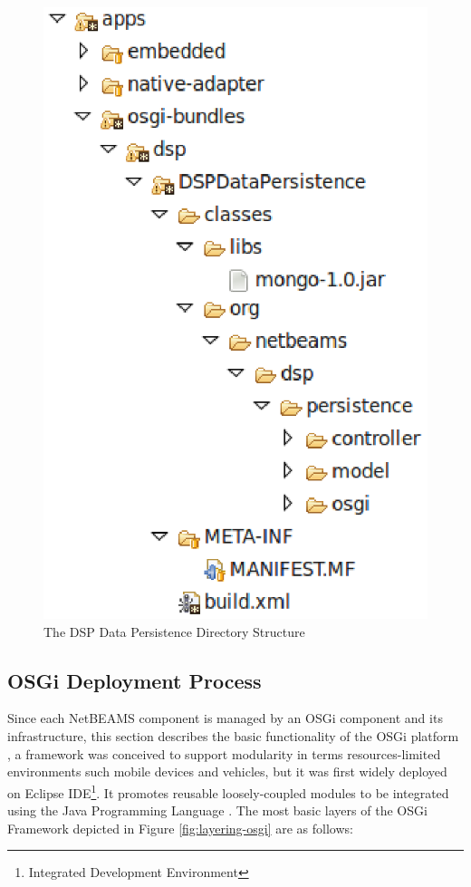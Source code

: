 \begin{figure}[!h]
  \centering
  \includegraphics[scale=0.65]{../diagrams/dsp-data-persistence-dir-checkedout}
  \caption{The DSP Data Persistence Directory Structure}
  \label{fig:dsp-data-persistence-dir-checkedout}
\end{figure}

\subsection{OSGi Deployment Process}
\label{sec:dsp-component-osgi-deployment}

Since each NetBEAMS component is managed by an OSGi component and its
infrastructure, this section describes the basic functionality of the
OSGi platform \cite{osgi}, a framework was conceived to support
modularity in terms resources-limited environments such mobile devices and
vehicles, but it was first widely deployed on Eclipse IDE\footnote{Integrated
Development Environment}. It promotes reusable loosely-coupled modules to be
integrated using the Java Programming Language \cite{java}. The most basic
layers of the OSGi Framework depicted in Figure \ref{fig:layering-osgi} are as
follows:

